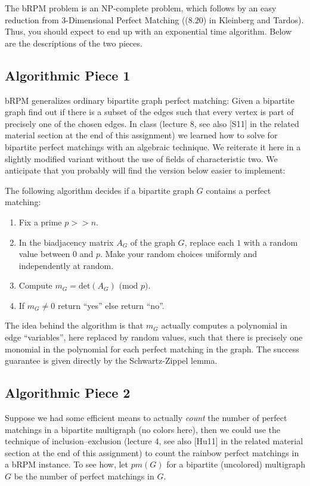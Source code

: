 \documentclass{tufte-handout}
\begin{document}
The bRPM problem is an NP-complete problem, which follows by an easy
reduction from 3-Dimensional Perfect Matching ((8.20) in Kleinberg and
Tardos). Thus, you should expect to end up with an exponential time algorithm.
Below are the descriptions of the two pieces.

\subsection*{Algorithmic Piece 1}
bRPM generalizes ordinary bipartite graph perfect matching: Given a bipartite graph find out if there is a subset of the edges such that every vertex is part of precisely one of the chosen edges. In class (lecture 8, see also [S11] in the related material section at the end of this assignment) we learned how to solve for bipartite perfect matchings with an algebraic technique. We reiterate it here in a slightly modified variant without the use of  fields of characteristic two. We anticipate that you probably will find the version below easier to implement:

 The following algorithm decides if a bipartite graph $G$ contains a
 perfect matching:
\begin{enumerate}
\item Fix a prime $p>\!\!\!>n$.
\item In the biadjacency matrix $A_G$ of the graph $G$, replace each $1$ with a random value between $0$ and $p$. Make your random choices uniformly and independently at random.
\item Compute $m_G=\mbox{det}(A_G)\mbox{ (mod $p$)}$.
\item If $m_G\neq 0$ return ``yes'' else return ``no''.
\end{enumerate}

The idea behind the algorithm is that $m_G$ actually computes a polynomial in edge ``variables'', here replaced by random values, such that there is precisely one monomial in the polynomial for each perfect matching in the graph. The success guarantee is given directly by the Schwartz-Zippel lemma.

\subsection*{Algorithmic Piece 2}
Suppose we had some efficient means to actually \emph{count} the
number of perfect matchings in a bipartite multigraph (no colors
here), then we could use the technique of inclusion--exclusion
(lecture 4, see also [Hu11] in the related material section at the end
of this assignment) to count the rainbow perfect matchings in a bRPM
instance. To see how, let $pm(G)$ for a
bipartite (uncolored) multigraph $G$ be the number of perfect
matchings in $G$.
\end{document}
